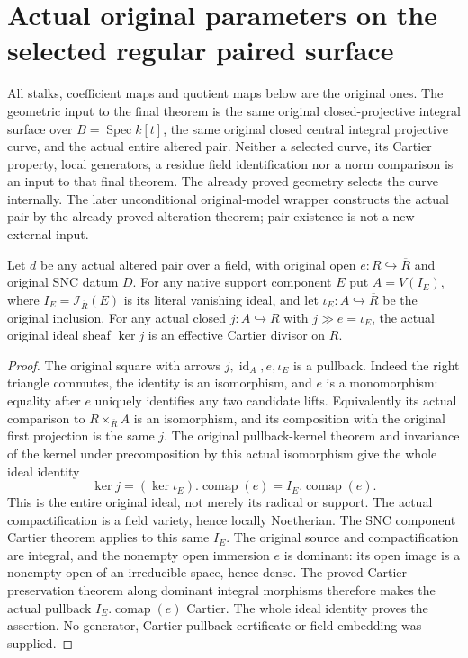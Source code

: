 \section{Actual original parameters on the selected regular paired surface}

All stalks, coefficient maps and quotient maps below are the original ones.
The geometric input to the final theorem is the same original closed-projective
integral surface over $B=\operatorname{Spec}k[t]$, the same original closed
central integral projective curve, and the actual entire altered pair.
Neither a selected curve, its Cartier property, local generators, a residue
field identification nor a norm comparison is an input to that final theorem.
The already proved geometry selects the curve internally. The later
unconditional original-model wrapper constructs the actual pair by the
already proved alteration theorem; pair existence is not a new external input.

\begin{lemma}
\label{lem:pl-gauss-paired-open-component-kernel-cartier}
\leanok
Let $d$ be any actual altered pair over a field, with original open
$e:R\hookrightarrow\overline R$ and original SNC datum $D$. For any
native support component $E$ put $A=V(I_E)$, where
$I_E=\mathcal I_{\overline R}(E)$ is its literal vanishing ideal,
and let $\iota_E:A\hookrightarrow\overline R$ be the original inclusion.
For any actual closed $j:A\hookrightarrow R$ with
$j\gg e=\iota_E$, the actual original ideal sheaf $\ker j$ is
an effective Cartier divisor on $R$.
\end{lemma}
\begin{proof}
The original square with arrows $j,\operatorname{id}_A,e,\iota_E$
is a pullback. Indeed the right triangle commutes, the identity is an
isomorphism, and $e$ is a monomorphism: equality after $e$ uniquely
identifies any two candidate lifts. Equivalently its actual comparison
to $R\times_{\overline R}A$ is an isomorphism, and its composition
with the original first projection is the same $j$.
The original pullback-kernel theorem and invariance of the kernel
under precomposition by this actual isomorphism give the whole ideal
identity
\[
 \ker j=(\ker\iota_E).\operatorname{comap}(e)
       =I_E.\operatorname{comap}(e).
\]
This is the entire original ideal, not merely its radical or support.
The actual compactification is a field variety, hence locally
Noetherian. The SNC component Cartier theorem applies to this same
$I_E$. The original source and compactification are integral, and
the nonempty open immersion $e$ is dominant: its open image is a
nonempty open of an irreducible space, hence dense. The proved
Cartier-preservation theorem along dominant integral morphisms
therefore makes the actual pullback $I_E.\operatorname{comap}(e)$
Cartier. The whole ideal identity proves the assertion. No generator,
Cartier pullback certificate or field embedding was supplied.
\end{proof}

